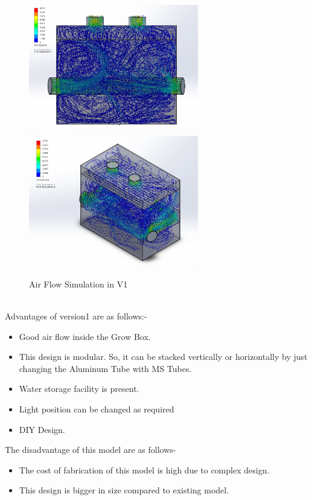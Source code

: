 \documentclass[a4paper,12pt,oneside]{book}
\begin{document}
\begin{figure}[h!]
\includegraphics[width=210pt]{version_1_FV}
\includegraphics[width=210pt]{version_1_ISO}
\caption{Air Flow Simulation in V1}
\end{figure}
\\Advantages of version1 are as follows:-
\begin{itemize}
    \item Good air flow inside the Grow Box.
    \item This design is modular. So, it can be stacked vertically or horizontally by just changing the Aluminum Tube with MS Tubes.
    \item Water storage facility is present.
    \item Light position can be changed as required
    \item DIY Design.
\end{itemize}
The disadvantage of this model are as follows- 
\begin{itemize}
\item The cost of fabrication of this model is high due to complex design. 
\item This design is bigger in size compared to existing model.
\end{itemize}
\end{document}
